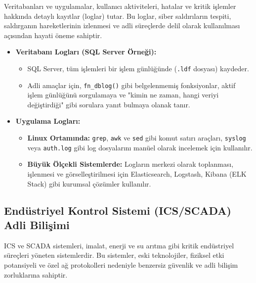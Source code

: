 Veritabanları ve uygulamalar, kullanıcı aktiviteleri, hatalar ve kritik işlemler hakkında detaylı kayıtlar (loglar) tutar. Bu loglar, siber saldırıların tespiti, saldırganın hareketlerinin izlenmesi ve adli süreçlerde delil olarak kullanılması açısından hayati öneme sahiptir.

\begin{itemize}
    \item \textbf{Veritabanı Logları (SQL Server Örneği):}
    \begin{itemize}
        \item SQL Server, tüm işlemleri bir işlem günlüğünde (\texttt{.ldf} dosyası) kaydeder.
        \item Adli amaçlar için, \texttt{fn\_dblog()} gibi belgelenmemiş fonksiyonlar, aktif işlem günlüğünü sorgulamaya ve "kimin ne zaman, hangi veriyi değiştirdiği" gibi sorulara yanıt bulmaya olanak tanır.
    \end{itemize}
    \item \textbf{Uygulama Logları:}
    \begin{itemize}
        \item \textbf{Linux Ortamında:} \texttt{grep}, \texttt{awk} ve \texttt{sed} gibi komut satırı araçları, \texttt{syslog} veya \texttt{auth.log} gibi log dosyalarını manüel olarak incelemek için kullanılır.
        \item \textbf{Büyük Ölçekli Sistemlerde:} Logların merkezi olarak toplanması, işlenmesi ve görselleştirilmesi için Elasticsearch, Logstash, Kibana (ELK Stack) gibi kurumsal çözümler kullanılır.
    \end{itemize}
\end{itemize}

\subsection{Endüstriyel Kontrol Sistemi (ICS/SCADA) Adli Bilişimi}

ICS ve SCADA sistemleri, imalat, enerji ve su arıtma gibi kritik endüstriyel süreçleri yöneten sistemlerdir. Bu sistemler, eski teknolojiler, fiziksel etki potansiyeli ve özel ağ protokolleri nedeniyle benzersiz güvenlik ve adli bilişim zorluklarına sahiptir.

